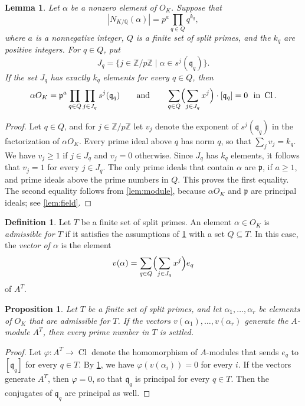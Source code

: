 \documentclass[11pt]{amsart}
\theoremstyle{plain}
\newtheorem{proposition}[theorem]{Proposition}
\newtheorem{lemma}[theorem]{Lemma}
\theoremstyle{definition}
\newtheorem{definition}[theorem]{Definition}
\begin{document}
\begin{lemma} \label{lem:vector}
Let $\alpha$ be a nonzero element of $O_K$.
Suppose that
\[
|N_{K/\mathbb{Q}}(\alpha)| = p^a \prod_{q \in Q} q^{k_q},
\]
where $a$ is a nonnegative integer, $Q$ is a finite set of split primes, and the $k_q$ are positive integers.
For $q \in Q$, put
\[
J_q = \{ j \in \mathbb{Z}/p\mathbb{Z} \mid \alpha \in s^j(\mathfrak{q}_q) \} .
\]
If the set $J_q$ has exactly $k_q$ elements for every $q \in Q$, then
\[
\alpha O_K = \mathfrak{p}^a \prod_{q \in Q} \prod_{j \in J_q} s^j(\mathfrak{q}_q)
\qquad \text{and} \qquad
\sum_{q \in Q} \Bigl( \sum_{j \in J_q} x^j \Bigr) \cdot [\mathfrak{q}_q] = 0 \ \text{ in } \operatorname{Cl} .
\]
\end{lemma}

\begin{proof}
Let $q \in Q$, and for $j \in \mathbb{Z}/p\mathbb{Z}$ let $v_j$ denote the exponent of $s^j(\mathfrak{q}_q)$ in the factorization of $\alpha O_K$.
Every prime ideal above $q$ has norm $q$, so that $\sum_j v_j = k_q$.
We have $v_j \ge 1$ if $j \in J_q$ and $v_j = 0$ otherwise.
Since $J_q$ has $k_q$ elements, it follows that $v_j = 1$ for every $j \in J_q$.
The only prime ideals that contain $\alpha$ are $\mathfrak{p}$, if $a \ge 1$, and prime ideals above the prime numbers in $Q$.
This proves the first equality.
The second equality follows from \cref{lem:module}, because $\alpha O_K$ and $\mathfrak{p}$ are principal ideals; see \cref{lem:field}.
\end{proof}

\begin{definition} \label{def:vector}
Let $T$ be a finite set of split primes.
An element $\alpha \in O_K$ is \emph{admissible for $T$} if it satisfies the assumptions of \cref{lem:vector} with a set $Q \subseteq T$.
In this case, the \emph{vector of $\alpha$} is the element
\[
v(\alpha) = \sum_{q \in Q} \Bigl( \sum_{j \in J_q} x^j \Bigr) e_q
\]
of $A^T$.
\end{definition}

\begin{proposition} \label{prop:span}
Let $T$ be a finite set of split primes, and let $\alpha_1, \dots, \alpha_r$ be elements of $O_K$ that are admissible for $T$.
If the vectors $v(\alpha_1), \dots, v(\alpha_r)$ generate the $A$-module $A^T$, then every prime number in $T$ is settled.
\end{proposition}

\begin{proof}
Let $\varphi \colon A^T \to \operatorname{Cl}$ denote the homomorphism of $A$-modules that sends $e_q$ to $[\mathfrak{q}_q]$ for every $q \in T$.
By \cref{lem:vector}, we have $\varphi(v(\alpha_i)) = 0$ for every $i$.
If the vectors generate $A^T$, then $\varphi = 0$, so that $\mathfrak{q}_q$ is principal for every $q \in T$.
Then the conjugates of $\mathfrak{q}_q$ are principal as well.
\end{proof}
\end{document}
